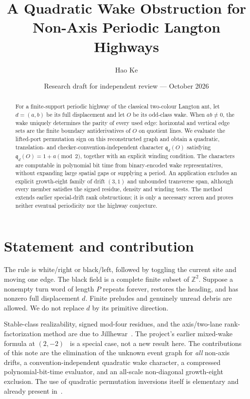 \documentclass[11pt]{article}
\title{A Quadratic Wake Obstruction for\\Non-Axis Periodic Langton Highways}
\author{Hao Ke}
\date{Research draft for independent review --- October 2026}
\newcommand{\Z}{\mathbb Z}
\newcommand{\qd}{\mathfrak q_d}
\begin{document}
\maketitle
\begin{abstract}
For a finite-support periodic highway of the classical two-colour Langton ant,
let $d=(a,b)$ be its full displacement and let $O$ be its odd-class wake.
When $ab\ne0$, the wake uniquely determines the parity of every used edge:
horizontal and vertical edge sets are the finite boundary antiderivatives of
$O$ on quotient lines. We evaluate the lifted-port permutation sign on this
reconstructed graph and obtain a quadratic, translation- and
checker-convention-independent character $\qd(O)$ satisfying
$\qd(O)=1+a\pmod2$, together with an explicit winding condition.
The characters are computable in polynomial bit time from binary-encoded wake
representatives, without expanding large spatial gaps or supplying a period.
An application excludes an explicit growth-eight family of drift $(3,1)$ and
unbounded transverse span, although every member satisfies the signed residue,
density and winding tests. The method extends earlier special-drift rank
obstructions; it is only a necessary screen and proves neither eventual
periodicity nor the highway conjecture.
\end{abstract}

\section{Statement and contribution}
The rule is white/right or black/left, followed by toggling the current site
and moving one edge. The black field is a complete finite subset of $\Z^2$.
Suppose a nonempty turn word of length $P$ repeats forever, restores the heading,
and has nonzero full displacement $d$. Finite preludes and genuinely unread
debris are allowed. We do not replace $d$ by its primitive direction.

Stable-class realizability, signed mod-four residues, and the axis/two-lane
rank-factorization method are due to Jillhewar~\cite{J}. The project's earlier
mixed-wake formula at $(2,-2)$~\cite{M} is a special case, not a new result here.
The contributions of this note are the elimination of the unknown event graph
for \emph{all} non-axis drifts, a convention-independent quadratic wake
character, a compressed polynomial-bit-time evaluator, and an all-scale
non-diagonal growth-eight exclusion. The use of quadratic permutation
inversions itself is elementary and already present in~\cite{J}.
\end{document}
